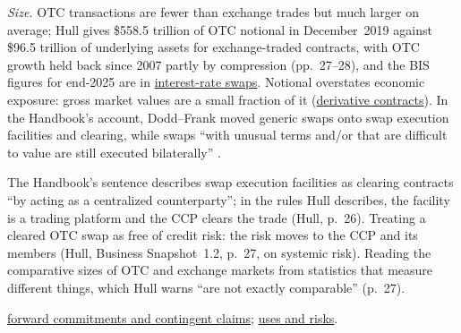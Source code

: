 \begin{qfdefinition}
 \emph{Size.} OTC transactions are fewer than exchange trades but much larger on average; Hull gives \$558.5 trillion of OTC notional in December~2019 against \$96.5 trillion of underlying assets for exchange-traded contracts, with OTC growth held back since 2007 partly by compression (pp.~27--28), and the BIS figures for end-2025 are in \hyperref[def:interest-rate-swaps]{interest-rate swaps}. Notional overstates economic exposure: gross market values are a small fraction of it (\hyperref[def:derivative-contracts]{derivative contracts}). In the Handbook's account, Dodd--Frank moved generic swaps onto swap execution facilities and clearing, while swaps ``with unusual terms and/or that are difficult to value are still executed bilaterally'' \citep[chap.~64, p.~1577]{s7-fabozzifixed}.

 The Handbook's sentence describes swap execution facilities as clearing contracts ``by acting as a centralized counterparty''; in the rules Hull describes, the facility is a trading platform and the CCP clears the trade (Hull, p.~26). Treating a cleared OTC swap as free of credit risk: the risk moves to the CCP and its members (Hull, Business Snapshot~1.2, p.~27, on systemic risk). Reading the comparative sizes of OTC and exchange markets from statistics that measure different things, which Hull warns ``are not exactly comparable'' (p.~27).

 \hyperref[def:derivative-types-commitments-contingent]{forward commitments and contingent claims}; \hyperref[def:derivative-uses-risks]{uses and risks}.

\end{qfdefinition}

